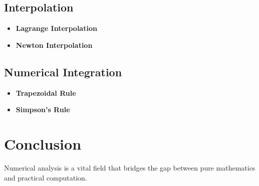 \documentclass[12pt]{article}
\begin{document}
\subsection{Interpolation}
\begin{itemize}
    \item \textbf{Lagrange Interpolation}
    \item \textbf{Newton Interpolation}
\end{itemize}

\subsection{Numerical Integration}
\begin{itemize}
    \item \textbf{Trapezoidal Rule}
    \item \textbf{Simpson's Rule}
\end{itemize}

\section{Conclusion}
Numerical analysis is a vital field that bridges the gap between pure mathematics and practical computation.
\end{document}

